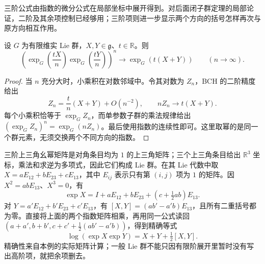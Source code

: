 三阶公式由指数的微分公式在局部坐标中展开得到。对后面闭子群定理的局部论证，二阶及其余项控制已经够用；三阶项则进一步显示两个方向的括号怎样再次与原方向相互作用。

\begin{corollary}\label{g1:cor:lie-product-limit}
	设 \(G\) 为有限维实 Lie 群，\(X,Y\in\mathfrak g\)、\(t\in\mathbb R\)。则
	\[
		\left(\exp_G\left(\frac{tX}{n}\right)
		\exp_G\left(\frac{tY}{n}\right)\right)^n
		\longrightarrow\exp_G(t(X+Y))\qquad(n\to\infty).
	\]
\end{corollary}
\begin{proof}
	当 \(n\) 充分大时，小乘积在对数邻域中。令其对数为 \(Z_n\)，BCH 的二阶精度给出
	\[
		Z_n=\frac t n(X+Y)+O(n^{-2}),\qquad nZ_n\longrightarrow t(X+Y).
	\]
	每个小乘积恰等于 \(\exp_GZ_n\)，而单参数子群的乘法规律给出 \((\exp_GZ_n)^n=\exp_G(nZ_n)\)。最后使用指数的连续性即可。这里取幂的是同一个群元素，无须交换两个不同方向的指数。
\end{proof}

\begin{example}\label{g1:exm:heisenberg-bch}
	三阶上三角幺幂矩阵是对角条目均为 \(1\) 的上三角矩阵；三个上三角条目给出 \(\mathbb R^3\) 坐标，乘法和求逆为多项式，因此它们构成 Lie 群。在其 Lie 代数中取 \(X=aE_{12}+bE_{23}+cE_{13}\)，其中 \(E_{ij}\) 表示只有第 \((i,j)\) 项为 \(1\) 的矩阵。因 \(X^2=abE_{13}\)、\(X^3=0\)，有
	\[
		\exp X=I+aE_{12}+bE_{23}+\left(c+\tfrac12ab\right)E_{13}.
	\]
	对 \(Y=a'E_{12}+b'E_{23}+c'E_{13}\)，有 \([X,Y]=(ab'-a'b)E_{13}\)，且所有二重括号都为零。直接将上面的两个指数矩阵相乘，再用同一公式读回 \((a+a',b+b',c+c'+\tfrac12(ab'-a'b))\)，得到精确等式
	\[
		\log(\exp X\exp Y)=X+Y+\tfrac12[X,Y].
	\]
	精确性来自本例的实际矩阵计算；一般 Lie 群不能只因有限阶展开里暂时没有写出高阶项，就把余项删去。
\end{example}
